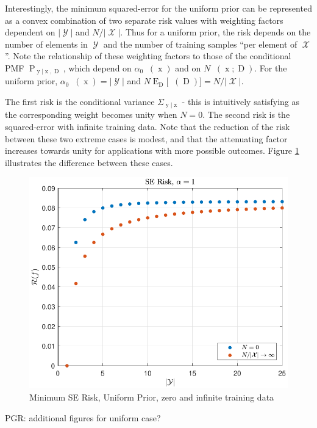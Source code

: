 \documentclass[12pt]{report}
\DeclareMathOperator{\xrm}{\mathrm{x}}
\DeclareMathOperator{\yrm}{\mathrm{y}}
\DeclareMathOperator{\Drm}{\mathrm{D}}
\DeclareMathOperator{\Prm}{\mathrm{P}}
\DeclareMathOperator{\Erm}{\mathrm{E}}
\DeclareMathOperator{\Xcal}{\mathcal{X}}
\DeclareMathOperator{\Ycal}{\mathcal{Y}}
\DeclareMathOperator{\Psim}{\Psi_\text{m}}
\DeclareMathOperator{\alpham}{\alpha_\text{m}}
\begin{document}
Interestingly, the minimum squared-error for the uniform prior can be represented as a convex combination of two separate risk values with weighting factors dependent on $|\Ycal|$ and $N/|\Xcal|$. Thus for a uniform prior, the risk depends on the number of elements in $\Ycal$ and the number of training samples ``per element of $\Xcal$''. Note the relationship of these weighting factors to those of the conditional PMF $\Prm_{\yrm | \xrm,\Drm}$, which depend on $\alpha_0 \alpham(\xrm)$ and on $N \Psim(\xrm;\Drm)$. For the uniform prior, $\alpha_0 \alpham(\xrm) = |\Ycal|$ and $N \Erm_{\Drm}\big[ \Psim(\Drm) \big] = N/|\Xcal|$.

The first risk is the conditional variance $\Sigma_{\yrm|\xrm}$ - this is intuitively satisfying as the corresponding weight becomes unity when $N=0$. The second risk is the squared-error with infinite training data. Note that the reduction of the risk between these two extreme cases is modest, and that the attenuating factor increases towards unity for applications with more possible outcomes. Figure \ref{fig:Risk_SE_uniform_N_lim} illustrates the difference between these cases.

\begin{figure}
\centering
\includegraphics[width=0.7\linewidth]{Risk_SE_uniform_N_lim.pdf}
\caption{Minimum SE Risk, Uniform Prior, zero and infinite training data}
\label{fig:Risk_SE_uniform_N_lim}
\end{figure}


PGR: additional figures for uniform case?

%
%
\end{document}
